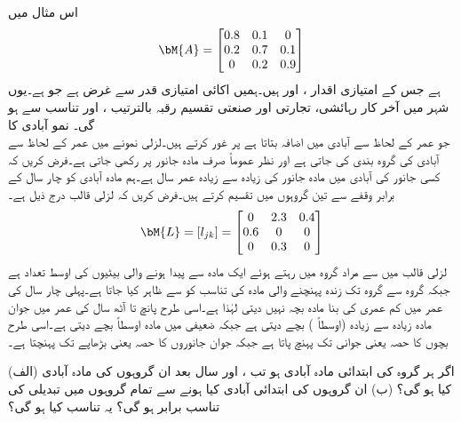 اس مثال میں 
\begin{align*}
\bM{A}=\begin{bmatrix}
0.8&0.1&0\\0.2&0.7&0.1\\0&0.2&0.9
\end{bmatrix}
\end{align*}
ہے جس کے امتیازی اقدار ،  اور  ہیں۔ہمیں اکائی امتیازی قدر  سے غرض ہے جو  ہے۔یوں شہر میں آخر کار رہائشی، تجارتی اور صنعتی تقسیم رقبہ بالترتیب ،  اور  تناسب سے ہو گی۔
\quad نمو آبادی کا \\ 
 جو عمر کے لحاظ سے آبادی میں اضافہ بتاتا ہے پر غور کرتے ہیں۔لزلی نمونے میں عمر کے لحاظ سے آبادی کی گروہ بندی کی جاتی ہے اور نظر عموماً صرف مادہ جانور پر رکھی جاتی ہے۔فرض کریں کہ کسی جانور کی آبادی میں مادہ جانور کی زیادہ سے زیادہ عمر  سال ہے۔ہم مادہ آبادی کو چار سال کے برابر وقفے سے تین گروہوں میں تقسیم کرتے ہیں۔فرض کریں کہ لزلی قالب درج ذیل ہے۔
\begin{align*}
\bM{L}=[l_{jk}]=\begin{bmatrix} 0& 2.3&0.4\\0.6&0&0\\0&0.3&0 \end{bmatrix}
\end{align*}
لزلی قالب میں   سے مراد  گروہ میں رہتے ہوئے  ایک مادہ سے پیدا ہونے والی بیٹیوں کی اوسط تعداد ہے جبکہ گروہ  سے گروہ  تک زندہ پہنچنے والی مادہ کی تناسب کو  سے ظاہر کیا جاتا ہے۔پہلی چار سال کی عمر میں کم عمری کی بنا مادہ بچہ نہیں دیتی لہٰذا  ہے۔اسی طرح پانچ تا آٹھ سال کی عمر میں جوان مادہ زیادہ سے زیادہ (اوسطاً ) بچے  دیتی ہے جبکہ ضعیفی  میں مادہ  اوسطاً  بچے دیتی ہے۔اسی طرح بچوں کا  حصہ یعنی   جوانی تک پہنچ پاتا ہے جبکہ جوان جانوروں کا  حصہ یعنی  بڑھاپے تک پہنچتا ہے۔ 

 (الف) اگر ہر گروہ  کی ابتدائی مادہ  آبادی  ہو تب ،  اور  سال بعد ان گروہوں کی مادہ آبادی کیا ہو گی؟ (ب)  ان گروہوں کی ابتدائی آبادی کیا ہونے سے تمام گروہوں میں تبدیلی کی تناسب برابر ہو گی؟ یہ تناسب کیا ہو گی؟

